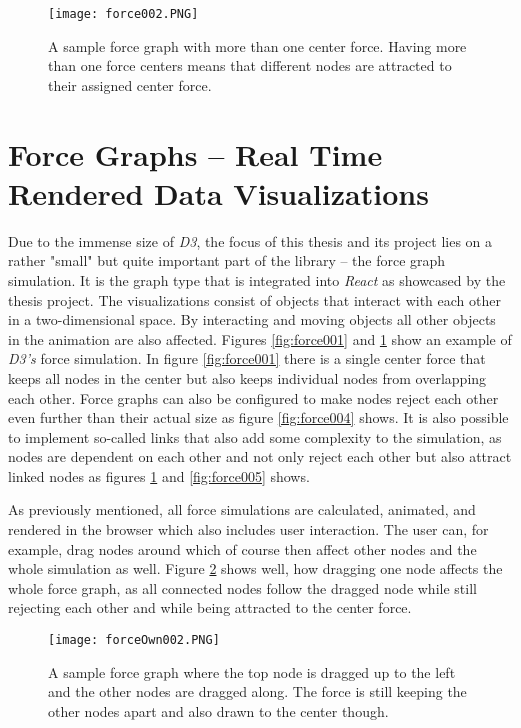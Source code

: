 \begin{figure}
  \centering
  \texttt{[image: force002.PNG]}
  \caption{A sample force graph with more than one center force. Having more than one force centers means that different nodes are attracted to their assigned center force.}
  \label{fig:force002}
\end{figure}

\section{Force Graphs -- Real Time Rendered Data Visualizations}

Due to the immense size of \emph{D3}, the focus of this thesis and its project lies on a rather "small" but quite important part of the library -- the force graph simulation. It is the graph type that is integrated into \emph{React} as showcased by the thesis project. The visualizations consist of objects that interact with each other in a two-dimensional space. By interacting and moving objects all other objects in the animation are also affected. Figures \ref{fig:force001} and \ref{fig:force002} show an example of \emph{D3's} force simulation. In figure \ref{fig:force001} there is a single center force that keeps all nodes in the center but also keeps individual nodes from overlapping each other. Force graphs can also be configured to make nodes reject each other even further than their actual size as figure \ref{fig:force004} shows. It is also possible to implement so-called links that also add some complexity to the simulation, as nodes are dependent on each other and not only reject each other but also attract linked nodes as figures \ref{fig:force002} and \ref{fig:force005} shows.

As previously mentioned, all force simulations are calculated, animated, and rendered in the browser which also includes user interaction. The user can, for example, drag nodes around which of course then affect other nodes and the whole simulation as well. Figure \ref{fig:force003} shows well, how dragging one node affects the whole force graph, as all connected nodes follow the dragged node while still rejecting each other and while being attracted to the center force.

\begin{figure}
  \centering
  \texttt{[image: forceOwn002.PNG]}
  \caption{A sample force graph where the top node is dragged up to the left and the other nodes are dragged along. The force is still keeping the other nodes apart and also drawn to the center though.}
  \label{fig:force003}
\end{figure}

